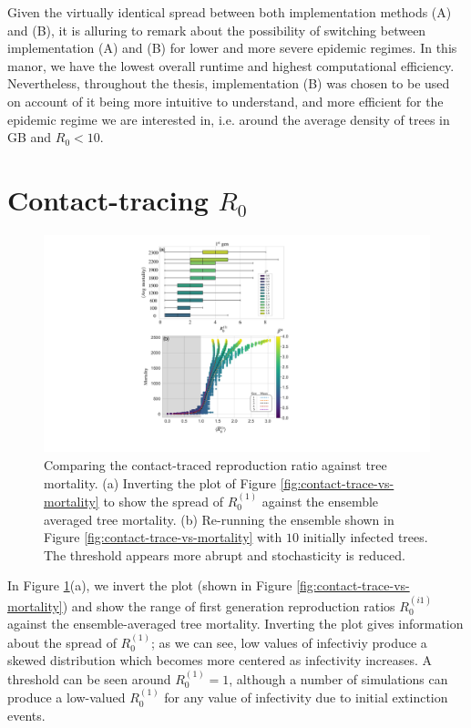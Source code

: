 Given the virtually identical spread between both implementation methods (A) and (B), it is alluring to remark about the possibility of switching between implementation (A) and (B) 
for lower and more severe epidemic regimes. 
In this manor, we have the lowest overall runtime and highest computational efficiency. 
Nevertheless, throughout the thesis, implementation (B) was chosen to be used on account of it being more intuitive to understand, and more efficient for the epidemic regime we are interested in, i.e. around the average density of trees in GB and $R_0 < 10$. 

\newpage

\section{Contact-tracing $R_0$}
\label{A:R0-contact-traced-mortality}

\begin{figure}
    \centering
    \includegraphics[scale=0.60]{chapter5/figures/fig6-R0-contact-vs-mortality-A.pdf}
    \caption{Comparing the contact-traced reproduction ratio against tree mortality. (a) Inverting the plot of Figure \ref{fig:contact-trace-vs-mortality} to show the spread of $R_0^{(1)}$ against the ensemble averaged tree mortality. (b)
    Re-running the ensemble shown in Figure \ref{fig:contact-trace-vs-mortality} with $10$ initially infected trees. The threshold appears more abrupt and stochasticity is reduced.}
    \label{fig:R0-contact-vs-morality-A}
\end{figure}

In Figure \ref{fig:R0-contact-vs-morality-A}(a), we invert the plot (shown in Figure \ref{fig:contact-trace-vs-mortality}) and show the range of first generation reproduction ratios $R_0^{(i1)}$ against the ensemble-averaged tree mortality.
Inverting the plot gives information about the spread of $R_0^{(1)}$;
as we can see, low values of infectiviy produce a skewed distribution which becomes more centered as infectivity increases.
A threshold can be seen around $R_0^{(1)}=1$, although a number of simulations can produce a low-valued $R_0^{(1)}$ for any value of infectivity due to initial extinction events.

